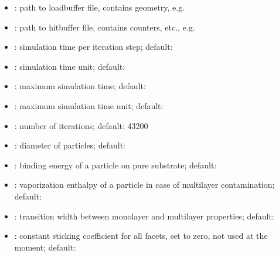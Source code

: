 \begin{itemize}[noitemsep,topsep=0pt, partopsep=0pt]
\item {}: path to loadbuffer file, contains geometry, e.g.\ 
\item {}: path to hitbuffer file, contains counters, etc., e.g.\ 
\item {}: simulation time per iteration step; default: 
\item {}: simulation time unit; default: 
\item {}: maximum simulation time; default: 
\item {}: maximum simulation time unit; default: 
\item {}: number of iterations; default: 43200
\item {}: diameter of particles; default:
\item {}: binding energy of a particle on pure substrate; default:
\item {}: vaporization enthalpy of a particle in case of multilayer contamination; default:
\item {}: transition width between monolayer and multilayer properties; default:
\item {}: constant sticking coefficient for all facets, set to zero, not used at the moment; default:

\end{itemize}
